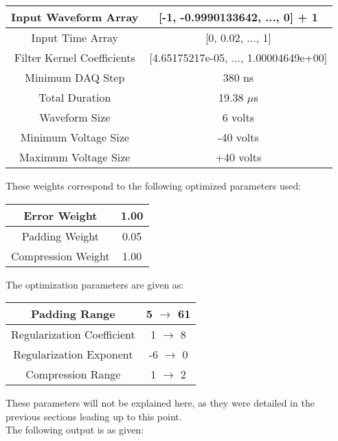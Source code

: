 \documentclass[11pt, a4paper]{article}
\theoremstyle{definition}
\numberwithin{equation}{section}
\begin{document}
\begin{center}
\begin{tabular}{ | c | c | } 
  \hline
   Input Waveform Array & [-1, -0.9990133642, ..., 0] + 1 \\ 
  \hline
  Input Time Array & [0, 0.02, ..., 1] \\ 
  \hline
  Filter Kernel Coefficients & [4.65175217e-05, ..., 1.00004649e+00] \\ 
  \hline
  Minimum DAQ Step & 380 ns \\ 
  \hline
  Total Duration & 19.38 $\mu$s \\ 
  \hline
  Waveform Size & 6 volts \\ 
  \hline
  Minimum Voltage Size & -40 volts \\ 
  \hline
  Maximum Voltage Size & +40 volts \\ 
  \hline
\end{tabular}
\end{center}

These weights correspond to the following optimized parameters used:

\begin{center}
\begin{tabular}{ | c | c | } 
  \hline
   Error Weight & 1.00 \\ 
  \hline
  Padding Weight & 0.05 \\ 
  \hline
  Compression Weight & 1.00 \\ 
  \hline
\end{tabular}
\end{center}

The optimization parameters are given as:

\begin{center}
\begin{tabular}{ | c | c | } 
  \hline
   Padding Range & 5 $\rightarrow$ 61 \\ 
  \hline
  Regularization Coefficient & 1 $\rightarrow$ 8 \\ 
  \hline
  Regularization Exponent & -6 $\rightarrow$ 0 \\ 
  \hline
  Compression Range & 1 $\rightarrow$ 2 \\ 
  \hline
\end{tabular}
\end{center}

These parameters will not be explained here, as they were detailed in the previous sections leading up to this point.
\\
The following output is as given:
\end{document}
